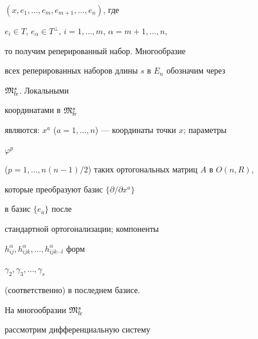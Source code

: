 $(x,e_1,\dotsc,e_m,e_{m+1},\dotsc,e_n)$, где 


$e_i\in T$, $e_\alpha\in T^\bot$, $i=1,\dotsc,m$, $\alpha=m+1,\dotsc,n$, 


то получим реперированный набор. Многообразие 


всех реперированных наборов длины $s$ в $E_n$ обозначим через 


$\frak M^s_{\text{fr}}$. Локальными 


координатами в $\frak M^s_{\text{fr}}$ 


являются: $x^a$ ($a=1,\dotsc,n$) --- координаты точки $x$; параметры 


$\varphi^p$ 


($p=1,\dotsc,n(n-1)/2$) таких ортогональных матриц $A$ в $O(n,R)$, 


которые преобразуют базис $\{\partial/\partial x^a\}$ 


в базис $\{e_a\}$ после 


стандартной ортогонализации; компоненты 


$h^\alpha_{ij},h^\alpha_{ijk},\dotsc,h^\alpha_{ijk\dotsb l}$ форм 


$\gamma_2,\gamma_3,\dotsc,\gamma_s$ 


(соответственно) в последнем базисе. 


 


На многообразии $\frak M^s_{\text{fr}}$ 


рассмотрим дифференциальную систему 


